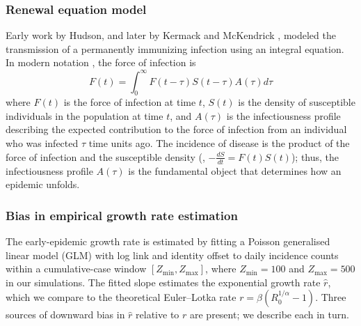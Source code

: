 \subsubsection{Renewal equation model}

Early work by Hudson, and later by Kermack and McKendrick \citep{kermack_contribution_1927}, modeled the transmission of a permanently immunizing infection using an integral equation. In modern notation \citep{breda_formulation_2012}, the force of infection is
%
\begin{equation} 
F(t) = \int_0^\infty F(t - \tau) S(t - \tau) A(\tau) d\tau 
\label{eq:foi}
\end{equation}
%
where $F(t)$ is the force of infection at time $t$, $S(t)$ is the density of susceptible individuals in the population at time $t$, and $A(\tau)$ is the infectiousness profile describing the expected contribution to the force of infection from an individual who was infected $\tau$ time units ago. The incidence of disease is the product of the force of infection and the susceptible density (\ie, $-\frac{dS}{dt} = F(t) S(t)$); thus, the infectiousness profile $A(\tau)$ is the fundamental object that determines how an epidemic unfolds. 

\clearpage

\subsubsection*{Bias in empirical growth rate estimation}

The early-epidemic growth rate is estimated by fitting a Poisson generalised linear model (GLM) with log link and identity offset to daily incidence counts within a cumulative-case window $[Z_{\min}, Z_{\max}]$, where $Z_{\min} = 100$ and $Z_{\max} = 500$ in our simulations. The fitted slope estimates the exponential growth rate $\hat{r}$, which we compare to the theoretical Euler--Lotka rate $r = \beta(R_0^{1/\alpha} - 1)$. Three sources of downward bias in $\hat{r}$ relative to $r$ are present; we describe each in turn.

